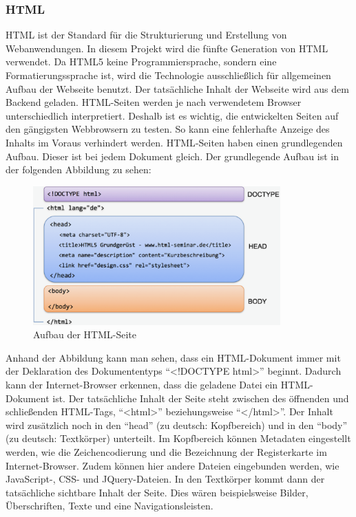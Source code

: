 	    \subsubsection{HTML}
	    \acf{HTML} ist der Standard für die Strukturierung und Erstellung von Webanwendungen. 
	    In diesem Projekt wird die fünfte Generation von \ac{HTML} verwendet. Da HTML5 keine Programmiersprache, sondern eine Formatierungssprache ist, wird die Technologie ausschließlich für allgemeinen Aufbau der Webseite benutzt. Der tatsächliche Inhalt der Webseite wird aus dem Backend geladen. \ac{HTML}-Seiten werden je nach verwendetem Browser unterschiedlich interpretiert. Deshalb ist es wichtig, die entwickelten Seiten auf den gängigsten Webbrowsern zu testen. So kann eine fehlerhafte Anzeige des Inhalts im Voraus verhindert werden. \ac{HTML}-Seiten haben einen grundlegenden Aufbau. Dieser ist bei jedem Dokument gleich. 
	    Der grundlegende Aufbau ist in der folgenden Abbildung zu sehen:
	    \begin{figure}[H]
	    			\centering 
	    			\includegraphics[width=9.5cm]{img/html1.png}
	    			\captionsetup{format=hang}
	    			\caption[Aufbau der HTML-Seite]{\label{fig:html} Aufbau der \ac{HTML}-Seite \footnotemark} 
	    \end{figure}
	    
	    
	    Anhand der Abbildung kann man sehen, dass ein \ac{HTML}-Dokument immer mit der Deklaration des Dokumententyps \enquote{<!DOCTYPE html>} beginnt. Dadurch kann der Internet-Browser erkennen, dass die geladene Datei ein \ac{HTML}-Dokument ist. Der tatsächliche Inhalt der Seite steht zwischen des öffnenden und schließenden \ac{HTML}-Tags, \enquote{<html>} beziehungsweise \enquote{</html>}. Der Inhalt wird zusätzlich noch in den \enquote{head} (zu deutsch: Kopfbereich) und in den \enquote{body} (zu deutsch: Textkörper) unterteilt. Im Kopfbereich können Metadaten eingestellt werden, wie die Zeichencodierung und die Bezeichnung der Registerkarte im Internet-Browser. Zudem können hier andere Dateien eingebunden werden, wie JavaScript-, \acs{CSS}- und JQuery-Dateien. In den Textkörper kommt dann der tatsächliche sichtbare Inhalt der Seite. Dies wären beispielsweise Bilder, Überschriften, Texte und eine Navigationsleisten.   
	    
